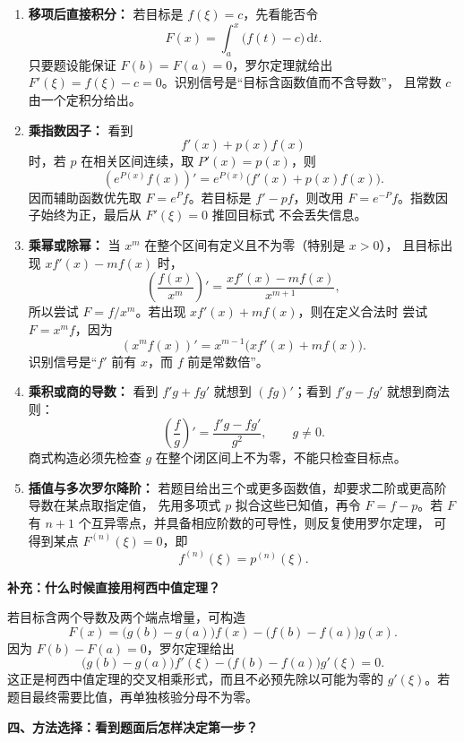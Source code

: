 \begin{knowledgeBox}
\begin{enumerate}
  \item \textbf{移项后直接积分：}
  若目标是 \(f(\xi)=c\)，先看能否令
  \[
  F(x)=\int_a^x\bigl(f(t)-c\bigr)\,\mathrm dt.
  \]
  只要题设能保证 \(F(b)=F(a)=0\)，罗尔定理就给出
  \(F'(\xi)=f(\xi)-c=0\)。识别信号是“目标含函数值而不含导数”，
  且常数 \(c\) 由一个定积分给出。

  \item \textbf{乘指数因子：}
  看到
  \[
  f'(x)+p(x)f(x)
  \]
  时，若 \(p\) 在相关区间连续，取 \(P'(x)=p(x)\)，则
  \[
  \left(e^{P(x)}f(x)\right)'
  =e^{P(x)}\bigl(f'(x)+p(x)f(x)\bigr).
  \]
  因而辅助函数优先取 \(F=e^P f\)。若目标是 \(f'-pf\)，则改用
  \(F=e^{-P}f\)。指数因子始终为正，最后从 \(F'(\xi)=0\) 推回目标式
  不会丢失信息。

  \item \textbf{乘幂或除幂：}
  当 \(x^m\) 在整个区间有定义且不为零（特别是 \(x>0\)），
  且目标出现 \(xf'(x)-mf(x)\) 时，
  \[
  \left(\frac{f(x)}{x^m}\right)'
  =\frac{xf'(x)-mf(x)}{x^{m+1}},
  \]
  所以尝试 \(F=f/x^m\)。若出现 \(xf'(x)+mf(x)\)，则在定义合法时
  尝试 \(F=x^m f\)，因为
  \[
  (x^m f(x))'=x^{m-1}\bigl(xf'(x)+mf(x)\bigr).
  \]
  识别信号是“\(f'\) 前有 \(x\)，而 \(f\) 前是常数倍”。

  \item \textbf{乘积或商的导数：}
  看到 \(f'g+fg'\) 就想到 \((fg)'\)；看到
  \(f'g-fg'\) 就想到商法则：
  \[
  \left(\frac{f}{g}\right)'
  =\frac{f'g-fg'}{g^2},\qquad g\ne0.
  \]
  商式构造必须先检查 \(g\) 在整个闭区间上不为零，不能只检查目标点。

  \item \textbf{插值与多次罗尔降阶：}
  若题目给出三个或更多函数值，却要求二阶或更高阶导数在某点取指定值，
  先用多项式 \(p\) 拟合这些已知值，再令 \(F=f-p\)。若 \(F\) 有
  \(n+1\) 个互异零点，并具备相应阶数的可导性，则反复使用罗尔定理，
  可得到某点 \(F^{(n)}(\xi)=0\)，即
  \[
  f^{(n)}(\xi)=p^{(n)}(\xi).
  \]
\end{enumerate}

\textbf{补充：什么时候直接用柯西中值定理？}

若目标含两个导数及两个端点增量，可构造
\[
F(x)=\bigl(g(b)-g(a)\bigr)f(x)
     -\bigl(f(b)-f(a)\bigr)g(x).
\]
因为 \(F(b)-F(a)=0\)，罗尔定理给出
\[
\bigl(g(b)-g(a)\bigr)f'(\xi)
-\bigl(f(b)-f(a)\bigr)g'(\xi)=0.
\]
这正是柯西中值定理的交叉相乘形式，而且不必预先除以可能为零的
\(g'(\xi)\)。若题目最终需要比值，再单独核验分母不为零。

\textbf{四、方法选择：看到题面后怎样决定第一步？}


\end{knowledgeBox}
